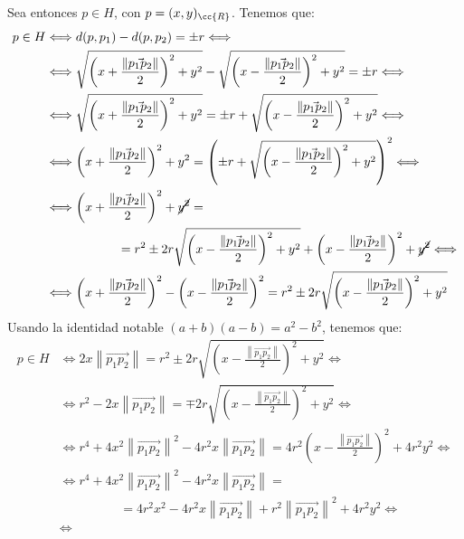 \begin{ejercicio}
\begin{enumerate}
    Sea entonces $p\in H$, con $p=(x,y)_{\cc{R}}$. Tenemos que:
    \begin{align*}
        p\in H &\Longleftrightarrow
        d(p,p_1) - d(p,p_2) = \pm r \Longleftrightarrow \\ & \Longleftrightarrow
        \sqrt{\left(x+\frac{\left\|\vec{p_1p_2}\right\|}{2}\right)^2 + y^2} - \sqrt{\left(x-\frac{\left\|\vec{p_1p_2}\right\|}{2}\right)^2 + y^2} = \pm r \Longleftrightarrow \\ & \Longleftrightarrow
        \sqrt{\left(x+\frac{\left\|\vec{p_1p_2}\right\|}{2}\right)^2 + y^2} = \pm r + \sqrt{\left(x-\frac{\left\|\vec{p_1p_2}\right\|}{2}\right)^2 + y^2} \Longleftrightarrow \\ & \Longleftrightarrow
        \left(x+\frac{\left\|\vec{p_1p_2}\right\|}{2}\right)^2 + y^2 = \left(\pm r + \sqrt{\left(x-\frac{\left\|\vec{p_1p_2}\right\|}{2}\right)^2 + y^2}\right)^2 \Longleftrightarrow \\ & \Longleftrightarrow
        \left(x+\frac{\left\|\vec{p_1p_2}\right\|}{2}\right)^2 + \cancel{y^2} =\\&\hspace{2cm}=r^2 \pm  2r\sqrt{\left(x-\frac{\left\|\vec{p_1p_2}\right\|}{2}\right)^2 + y^2} + \left(x-\frac{\left\|\vec{p_1p_2}\right\|}{2}\right)^2 + \cancel{y^2} \Longleftrightarrow \\ & \Longleftrightarrow
        \left(x+\frac{\left\|\vec{p_1p_2}\right\|}{2}\right)^2 - \left(x-\frac{\left\|\vec{p_1p_2}\right\|}{2}\right)^2 =r^2 \pm 2r\sqrt{\left(x-\frac{\left\|\vec{p_1p_2}\right\|}{2}\right)^2 + y^2}
    \end{align*}
    Usando la identidad notable $(a+b)(a-b)=a^2-b^2$, tenemos que:
    \begin{align*}
        p\in H &\Longleftrightarrow
        2x\left\|\vec{p_1p_2}\right\| = r^2 \pm 2r\sqrt{\left(x-\frac{\left\|\vec{p_1p_2}\right\|}{2}\right)^2 + y^2} \Longleftrightarrow \\ & \Longleftrightarrow
        r^2 - 2x\left\|\vec{p_1p_2}\right\| = \mp 2r\sqrt{\left(x-\frac{\left\|\vec{p_1p_2}\right\|}{2}\right)^2 + y^2} \Longleftrightarrow \\ & \Longleftrightarrow
        r^4 + 4x^2\left\|\vec{p_1p_2}\right\|^2 - 4r^2x\left\|\vec{p_1p_2}\right\| = 4r^2\left(x-\frac{\left\|\vec{p_1p_2}\right\|}{2}\right)^2 + 4r^2y^2 \Longleftrightarrow \\ & \Longleftrightarrow
        r^4 + 4x^2\left\|\vec{p_1p_2}\right\|^2 - 4r^2x\left\|\vec{p_1p_2}\right\| =\\&\hspace{2cm}=4r^2x^2 - 4r^2x\left\|\vec{p_1p_2}\right\| +r^2\left\|\vec{p_1p_2}\right\|^2 + 4r^2y^2 \Longleftrightarrow \\ & \Longleftrightarrow

\end{align*}
\end{enumerate}
\end{ejercicio}
